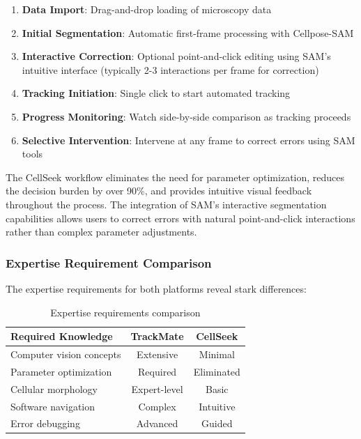 \documentclass[../cellseek_paper.tex]{subfiles}
\begin{document}
\begin{enumerate}
  \item \textbf{Data Import}: Drag-and-drop loading of microscopy data
  \item \textbf{Initial Segmentation}: Automatic first-frame processing with Cellpose-SAM
  \item \textbf{Interactive Correction}: Optional point-and-click editing using SAM's intuitive interface (typically 2-3 interactions per frame for correction)
  \item \textbf{Tracking Initiation}: Single click to start automated tracking
  \item \textbf{Progress Monitoring}: Watch side-by-side comparison as tracking proceeds
  \item \textbf{Selective Intervention}: Intervene at any frame to correct errors using SAM tools
\end{enumerate}

The CellSeek workflow eliminates the need for parameter optimization, reduces the decision burden by over 90\%, and provides intuitive visual feedback throughout the process. The integration of SAM's interactive segmentation capabilities allows users to correct errors with natural point-and-click interactions rather than complex parameter adjustments.

\subsubsection{Expertise Requirement Comparison}

The expertise requirements for both platforms reveal stark differences:

\begin{table}[H]
  \centering
  \caption{Expertise requirements comparison}
  \begin{tabular}{lcc}
    \toprule
    \textbf{Required Knowledge} & \textbf{TrackMate} & \textbf{CellSeek} \\
    \midrule
    Computer vision concepts    & Extensive          & Minimal           \\
    Parameter optimization      & Required           & Eliminated        \\
    Cellular morphology         & Expert-level       & Basic             \\
    Software navigation         & Complex            & Intuitive         \\
    Error debugging             & Advanced           & Guided            \\
    \bottomrule
  \end{tabular}
\end{table}
\end{document}
